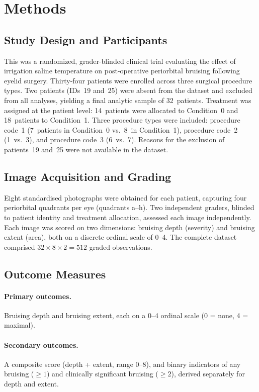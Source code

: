 \section{Methods}

\subsection{Study Design and Participants}

This was a randomized, grader-blinded clinical trial evaluating the effect of irrigation saline temperature on post-operative periorbital bruising following eyelid surgery. Thirty-four patients were enrolled across three surgical procedure types. Two patients (IDs~19 and~25) were absent from the dataset and excluded from all analyses, yielding a final analytic sample of 32~patients. Treatment was assigned at the patient level: 14~patients were allocated to Condition~0 and 18~patients to Condition~1. Three procedure types were included: procedure code~1 (7~patients in Condition~0 vs.\ 8~in Condition~1), procedure code~2 (1~vs.\ 3), and procedure code~3 (6~vs.\ 7). Reasons for the exclusion of patients~19 and~25 were not available in the dataset.

\subsection{Image Acquisition and Grading}

Eight standardised photographs were obtained for each patient, capturing four periorbital quadrants per eye (quadrants a--h). Two independent graders, blinded to patient identity and treatment allocation, assessed each image independently. Each image was scored on two dimensions: bruising depth (severity) and bruising extent (area), both on a discrete ordinal scale of 0--4. The complete dataset comprised $32 \times 8 \times 2 = 512$ graded observations.

\subsection{Outcome Measures}

\paragraph{Primary outcomes.} Bruising depth and bruising extent, each on a 0--4 ordinal scale (0 = none, 4 = maximal).

\paragraph{Secondary outcomes.} A composite score (depth + extent, range 0--8), and binary indicators of any bruising ($\geq 1$) and clinically significant bruising ($\geq 2$), derived separately for depth and extent.

